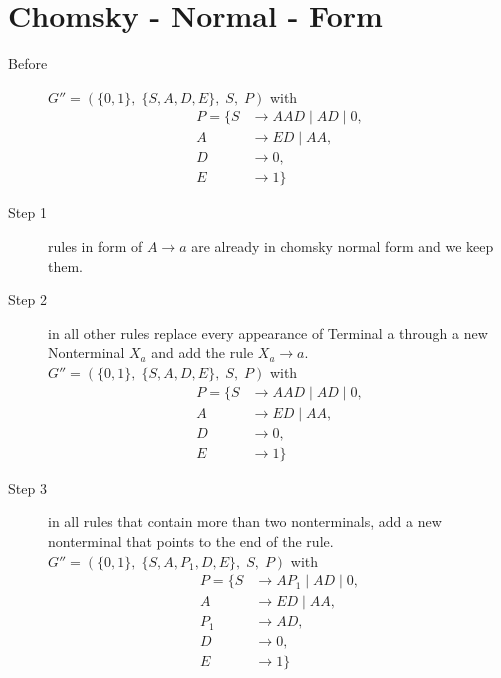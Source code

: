 \documentclass{article}
\begin{document}
\section{Chomsky - Normal - Form}
\begin{description}
	\item[Before]
	$G''=\left(\{	0, 1\},\;\{ S, A, D, E\},\;S,\;P\right)$ with
	\begin{align*}
		P=\{	S &\rightarrow AAD\;|\;AD\;|\;0, \\ 
		A &\rightarrow ED\;|\;AA, \\ 
		D &\rightarrow 0, \\ 
		E &\rightarrow 1\}
	\end{align*}
	\item[Step 1] rules in form of $A \rightarrow a$ are already in chomsky normal form and we keep them.
	\item[Step 2] in all other rules replace every appearance of Terminal a through a new Nonterminal $X_a$ and add the rule $X_a \rightarrow a$.
	$G''=\left(\{	0, 1\},\;\{ S, A, D, E\},\;S,\;P\right)$ with
	\begin{align*}
		P=\{	S &\rightarrow AAD\;|\;AD\;|\;0, \\ 
		A &\rightarrow ED\;|\;AA, \\ 
		D &\rightarrow 0, \\ 
		E &\rightarrow 1\}
	\end{align*}
	\item[Step 3] in all rules that contain more than two nonterminals, add a new nonterminal that points to the end of the rule.
	$G''=\left(\{	0, 1\},\;\{ S, A, P_1, D, E\},\;S,\;P\right)$ with
	\begin{align*}
		P=\{	S &\rightarrow AP_1\;|\;AD\;|\;0, \\ 
		A &\rightarrow ED\;|\;AA, \\ 
		P_1 &\rightarrow AD, \\ 
		D &\rightarrow 0, \\ 
		E &\rightarrow 1\}
	\end{align*}
\end{description}
\end{document}

